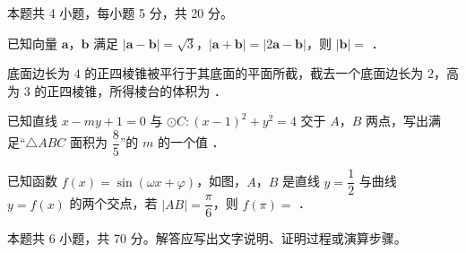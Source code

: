 \begin{gktip}
本题共 4 小题，每小题 5 分，共 20 分。
\end{gktip}

\begin{question}
已知向量 $\boldsymbol a$，$\boldsymbol b$ 满足 $|\boldsymbol a-\boldsymbol b|=\sqrt3$，$|\boldsymbol a+\boldsymbol b|=|2\boldsymbol a-\boldsymbol b|$，则 $|\boldsymbol b|=$ \gkblank{}．

\end{question}
\begin{question}
底面边长为 $4$ 的正四棱锥被平行于其底面的平面所截，截去一个底面边长为 $2$，高为 $3$ 的正四棱锥，所得棱台的体积为 \gkblank{}．

\end{question}
\begin{question}
已知直线 $x-my+1=0$ 与 $\odot C:(x-1)^{2}+y^{2}=4$ 交于 $A$，$B$ 两点，写出满足“$\triangle ABC$ 面积为 $\dfrac85$”的 $m$ 的一个值 \gkblank{}．

\Needspace{0.4\textheight}
\end{question}
\begin{question}
已知函数 $f(x)=\sin(\omega x+\varphi)$，如图，$A$，$B$ 是直线 $y=\dfrac12$ 与曲线 $y=f(x)$ 的两个交点，若 $|AB|=\dfrac\pi6$，则 $f(\pi)=$ \gkblank{}．
\nopagebreak[4]
\begin{center}\end{center}
\nopagebreak[4]
\par\medskip

\end{question}

\begin{gktip}
本题共 6 小题，共 70 分。解答应写出文字说明、证明过程或演算步骤。
\end{gktip}

